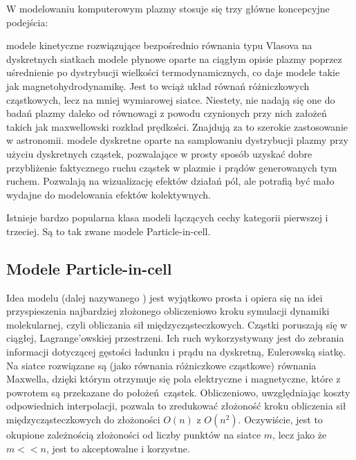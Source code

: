     W modelowaniu komputerowym plazmy stosuje się trzy główne koncepcyjne podejścia:
    \begin{enumerate}
        \itemi{} modele kinetyczne rozwiązujące bezpośrednio równania typu Vlasova
            na dyskretnych siatkach
        \itemi{} modele płynowe oparte na ciągłym opisie plazmy poprzez
            uśrednienie po dystrybucji wielkości termodynamicznych, co daje
            modele takie jak magnetohydrodynamikę. Jest to wciąż układ równań
            różniczkowych cząstkowych, lecz na mniej wymiarowej siatce.
            Niestety, nie nadają się one do badań plazmy daleko od równowagi z
            powodu czynionych przy nich założeń takich jak maxwellowski rozkład
            prędkości. Znajdują za to szerokie zastosowanie w astronomii.
        \itemi{} modele dyskretne oparte na samplowaniu dystrybucji plazmy przy
            użyciu dyskretnych cząstek, pozwalające w prosty sposób uzyskać
            dobre przybliżenie faktycznego ruchu cząstek w plazmie i prądów
            generowanych tym ruchem. Pozwalają na wizualizację efektów działań
            pól, ale potrafią być mało wydajne do modelowania efektów kolektywnych.
    \end{enumerate}

    Istnieje bardzo popularna klasa modeli łączących cechy kategorii pierwszej i trzeciej.
    Są to tak zwane modele Particle-in-cell.

    \subsection{Modele Particle-in-cell}

    Idea modelu  (dalej nazywanego ) jest wyjątkowo
    prosta i opiera się na idei przyspieszenia najbardziej złożonego obliczeniowo
    kroku symulacji dynamiki molekularnej, czyli obliczania sił
    międzycząsteczkowych.  Cząstki poruszają się w ciągłej, Lagrange'owskiej
    przestrzeni.  Ich ruch wykorzystywany jest do zebrania informacji dotyczącej
    gęstości ładunku i prądu na dyskretną, Eulerowską siatkę. Na siatce rozwiązane
    są (jako równania różniczkowe cząstkowe) równania Maxwella, dzięki którym
    otrzymuje się pola elektryczne i magnetyczne, które z powrotem są przekazane do
    położeń cząstek.  Obliczeniowo, uwzględniając koszty odpowiednich interpolacji,
    pozwala to zredukować złożoność kroku obliczenia sił międzycząsteczkowych do złożoności $O(n)$ z $O(n^2)$.
    Oczywiście, jest to okupione zależnością złożoności od liczby punktów na siatce $m$, lecz jako że $m << n$,
    jest to akceptowalne i korzystne.


